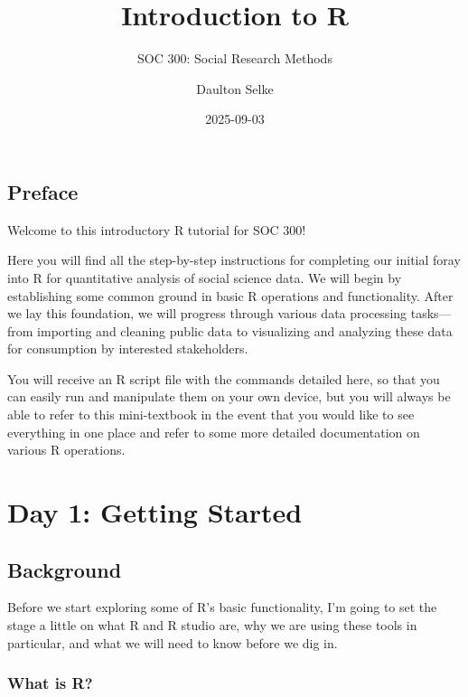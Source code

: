 \documentclass[
  letterpaper,
  DIV=11,
  numbers=noendperiod]{scrreprt}
\title{Introduction to R}
\subtitle{SOC 300: Social Research Methods}
\author{Daulton Selke}
\date{2025-09-03}
\renewcommand*\contentsname{Table of contents}
\newcommand\contentsname{Table of contents}
\begin{document}
\maketitle

\renewcommand*\contentsname{Table of contents}
{
\hypersetup{linkcolor=}
\setcounter{tocdepth}{2}
\tableofcontents
}


\chapter*{Preface}\label{preface}


Welcome to this introductory R tutorial for SOC 300!

Here you will find all the step-by-step instructions for completing our
initial foray into R for quantitative analysis of social science data.
We will begin by establishing some common ground in basic R operations
and functionality. After we lay this foundation, we will progress
through various data processing tasks---from importing and cleaning
public data to visualizing and analyzing these data for consumption by
interested stakeholders.

You will receive an R script file with the commands detailed here, so
that you can easily run and manipulate them on your own device, but you
will always be able to refer to this mini-textbook in the event that you
would like to see everything in one place and refer to some more
detailed documentation on various R operations.

\part{Day 1: Getting Started}

\chapter{Background}\label{background}

Before we start exploring some of R's basic functionality, I'm going to
set the stage a little on what R and R studio are, why we are using
these tools in particular, and what we will need to know before we dig
in.

\section{What is R?}\label{what-is-r}
\end{document}
